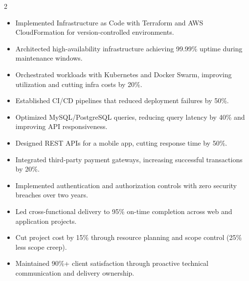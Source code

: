 \documentclass[10pt,a4paper,ragged2e,withhyper]{altacv}
\begin{document}
\begin{paracol}{2}
\begin{itemize}
\item Implemented Infrastructure as Code with Terraform and AWS CloudFormation for version-controlled environments.

\item Architected high-availability infrastructure achieving 99.99\% uptime during maintenance windows.

\item Orchestrated workloads with Kubernetes and Docker Swarm, improving utilization and cutting infra costs by 20\%.

\item Established CI/CD pipelines that reduced deployment failures by 50\%.
\end{itemize}

\divider


\begin{itemize}
\item Optimized MySQL/PostgreSQL queries, reducing query latency by 40\% and improving API responsiveness.

\item Designed REST APIs for a mobile app, cutting response time by 50\%.

\item Integrated third-party payment gateways, increasing successful transactions by 20\%.

\item Implemented authentication and authorization controls with zero security breaches over two years.
\end{itemize}

\divider


\begin{itemize}
\item Led cross-functional delivery to 95\% on-time completion across web and application projects.

\item Cut project cost by 15\% through resource planning and scope control (25\% less scope creep).

\item Maintained 90\%+ client satisfaction through proactive technical communication and delivery ownership.
\end{itemize}


\end{paracol}
\end{document}

